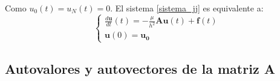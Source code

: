 \documentclass{endm}
\begin{document}
Como $u_0(t)=u_N(t)=0$. El sistema \ref{sistema_jj} es equivalente a:
\begin{equation} \label{sistema_Adt}
\begin{cases} 
   \frac{d \boldsymbol{u}}{d t}(t) = -\frac{\mu}{h^2} \boldsymbol{A} \boldsymbol{u}(t) + \boldsymbol{f}(t) \\
   \boldsymbol{u}(0) = \boldsymbol{u_0}
\end{cases}
\end{equation}


\subsection{Autovalores y autovectores de la matriz A}
\end{document}

